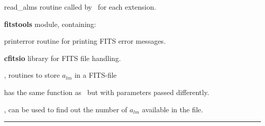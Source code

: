 \begin{modules}
  \begin{sulist}{} %
  \item[read\_alms] routine called by \thedocid\ for each extension.
  \item[\textbf{fitstools}] module, containing:
  \item[printerror] routine for printing FITS error messages.
  \item[\textbf{cfitsio}] library for FITS file handling.		
  \end{sulist}
\end{modules}
\newpage
\begin{related}
  \begin{sulist}{} %
  \item[\htmlref{alms2fits}{sub:alms2fits}, \htmlref{dump\_alms}{sub:dump_alms}] routines to store $a_{lm}$ in a FITS-file 
  \item[\htmlref{read\_conbintab}{sub:read_conbintab}] has the same function as
  \thedocid\ but with parameters passed differently.
  \item[\htmlref{number\_of\_alms}{sub:number_of_alms}, \htmlref{getsize\_fits}{sub:getsize_fits}]
  can be used to find out the number of $a_{lm}$ available in the file.
  \end{sulist}
\end{related}

\rule{\hsize}{2mm}

\newpage
